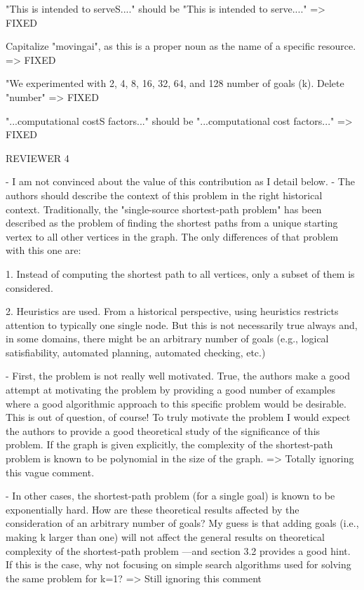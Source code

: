 "This is intended to serveS...." should be "This is
intended to serve...." => FIXED

Capitalize "movingai", as this is a proper noun as the name
of a specific resource.  => FIXED

"We experimented with 2, 4, 8, 16, 32, 64, and 128 number of
goals (k).  Delete "number" => FIXED

"...computational costS factors..." should be
"...computational cost factors..." => FIXED


REVIEWER 4

-  I am not convinced about the value of this contribution as I detail
  below.
-  The authors should describe the context of this
  problem in the right historical context. Traditionally, the
  "single-source shortest-path problem" has been described
as the   problem of finding the shortest paths from a unique starting vertex
  to all other vertices in the graph. The only differences of that
  problem with this one are:

  1. Instead of computing the shortest path to all vertices, only a
     subset of them is considered.

  2. Heuristics are used. From a historical perspective, using
     heuristics restricts attention to typically one single node. But
     this is not necessarily true always and, in some domains, there
     might be an arbitrary number of goals (e.g., logical
     satisfiability, automated planning, automated checking, etc.)

- First, the problem is not really well motivated. True, the authors
  make a good attempt at motivating the problem by providing a good
  number of examples where a good algorithmic approach to this
  specific problem would be desirable. This is out of question, of
  course! To truly motivate the problem I would expect the authors to
  provide a good theoretical study of the significance of this
  problem. If the graph is given explicitly, the complexity of the
  shortest-path problem is known to be polynomial in the size of the
  graph. => Totally ignoring this vague comment.
  
- In other cases, the shortest-path problem (for a single
goal) is known to be exponentially hard. How are these theoretical
results   affected by the consideration of an arbitrary number of goals? My
  guess is that adding goals (i.e., making k larger than one) will
not affect the general results on theoretical complexity of the
  shortest-path problem ---and section 3.2 provides a good hint. If
  this is the case, why not focusing on simple search algorithms used
  for solving the same problem for k=1? => Still ignoring this comment

